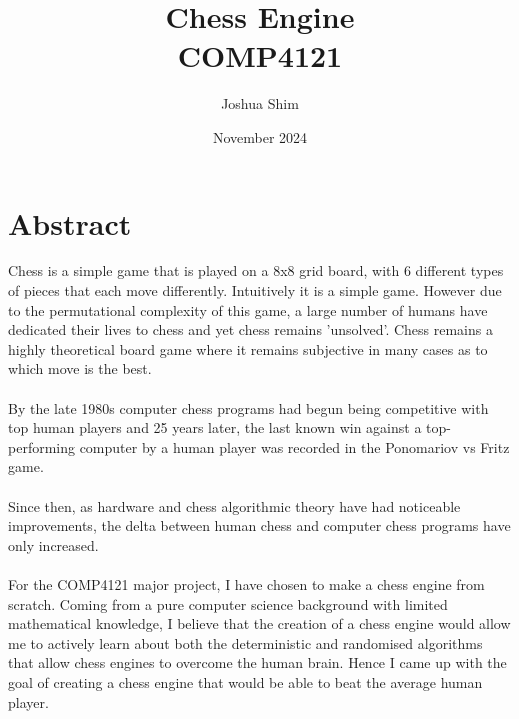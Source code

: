 \documentclass[twoside]{report}
\title{Chess Engine\\
{\Large COMP4121}}
\author{Joshua Shim}
\date{November 2024}
\begin{document}
\maketitle
\chapter*{Abstract}

Chess is a simple game that is played on a 8x8 grid board, with 6 different types of pieces that each move differently. Intuitively it is a simple game. However due to the permutational complexity of this game, a large number of humans have dedicated their lives to chess and yet chess remains 'unsolved'. Chess remains a highly theoretical board game where it remains subjective in many cases as to which move is the best.
\\\\
By the late 1980s computer chess programs had begun being competitive with top human players and 25 years later, the last known win against a top-performing computer by a human player was recorded in the Ponomariov vs Fritz game.
\\\\
Since then, as hardware and chess algorithmic theory have had noticeable improvements, the delta between human chess and computer chess programs have only increased.
\\\\

For the COMP4121 major project, I have chosen to make a chess engine from scratch. Coming from a pure computer science background with limited mathematical knowledge, I believe that the creation of a chess engine would allow me to actively learn about both the deterministic and randomised algorithms that allow chess engines to overcome the human brain. Hence I came up with the goal of creating a chess engine that would be able to beat the average human player.

\tableofcontents

% 
% 
% 
% 
% 
\end{document}
